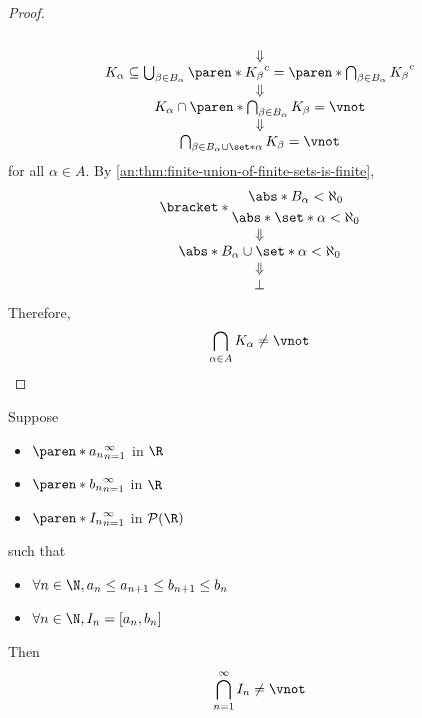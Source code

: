 \begin{proof}
\[\begin{array}{c}
{\begin{gathered}
        \end{gathered}}  \\
      \Downarrow                                                                     \\
      K_{\alpha} \subseteq \bigcup_{\beta \in B_{\alpha}}
      \paren*{K_{\beta}}^{c} = \paren*{\bigcap_{\beta \in B_{\alpha}} K_{\beta}}^{c} \\
      \Downarrow                                                                     \\
      K_{\alpha} \cap \paren*{\bigcap_{\beta \in B_{\alpha}} K_{\beta}} = \vnot      \\
      \Downarrow                                                                     \\
      \bigcap_{\beta \in B_{\alpha} \cup \set*{\alpha}} K_{\beta} = \vnot
    \end{array}
  \]
  for all $\alpha \in A$. By \cref{an:thm:finite-union-of-finite-sets-is-finite},
  \[
    \begin{array}{c}
      \bracket*{\begin{gathered}
          \abs*{B_{\alpha}} < \aleph_{0} \\
          \abs*{\set*{\alpha}} < \aleph_{0}
        \end{gathered}}              \\
      \Downarrow                                        \\
      \abs*{B_{\alpha} \cup \set*{\alpha}} < \aleph_{0} \\
      \Downarrow                                        \\
      \bot
    \end{array}
  \]
  Therefore,
  \[
    \bigcap_{\alpha \in A} K_{\alpha} \neq \vnot
  \]
\end{proof}

\bigskip

\begin{lemma} \label{an:lem:nested-intervals}
  Suppose
  \begin{itemize}
    \item $\paren*{a_{n}}_{n = 1}^{\infty}$ in $\R$
    \item $\paren*{b_{n}}_{n = 1}^{\infty}$ in $\R$
    \item $\paren*{I_{n}}_{n = 1}^{\infty}$ in $\mathcal{P}(\R)$
  \end{itemize}
  such that
  \begin{itemize}
    \item $\forall n \in \N, a_{n} \leq a_{n + 1} \leq b_{n + 1} \leq b_{n}$
    \item $\forall n \in \N, I_{n} = [a_{n}, b_{n}]$
  \end{itemize}
  Then
  \[
    \bigcap_{n = 1}^{\infty} I_{n} \neq \vnot
  \]
\end{lemma}

